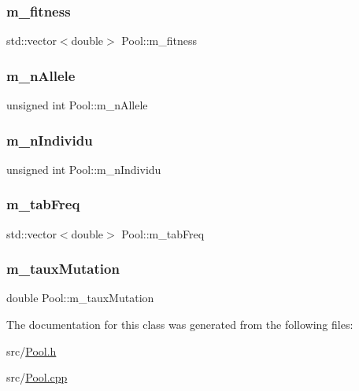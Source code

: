 \subsubsection{\texorpdfstring{m\+\_\+fitness}{m\_fitness}}
{\footnotesize\ttfamily std\+::vector$<$double$>$ Pool\+::m\+\_\+fitness\hspace{0.3cm}{\ttfamily [protected]}}

\hypertarget{class_pool_aa42040dcc5fc415227c86f684e40eb0c}{}\label{class_pool_aa42040dcc5fc415227c86f684e40eb0c} 
\subsubsection{\texorpdfstring{m\+\_\+n\+Allele}{m\_nAllele}}
{\footnotesize\ttfamily unsigned int Pool\+::m\+\_\+n\+Allele\hspace{0.3cm}{\ttfamily [protected]}}

\hypertarget{class_pool_ae07f1e012a30ee7bb47280d03b5ccfb6}{}\label{class_pool_ae07f1e012a30ee7bb47280d03b5ccfb6} 
\subsubsection{\texorpdfstring{m\+\_\+n\+Individu}{m\_nIndividu}}
{\footnotesize\ttfamily unsigned int Pool\+::m\+\_\+n\+Individu\hspace{0.3cm}{\ttfamily [protected]}}

\hypertarget{class_pool_ad3a94e7a298126eee82a7b4796a9970e}{}\label{class_pool_ad3a94e7a298126eee82a7b4796a9970e} 
\subsubsection{\texorpdfstring{m\+\_\+tab\+Freq}{m\_tabFreq}}
{\footnotesize\ttfamily std\+::vector$<$double$>$ Pool\+::m\+\_\+tab\+Freq\hspace{0.3cm}{\ttfamily [protected]}}

\hypertarget{class_pool_a2d1dff3e84b72f7048d33dc3d711e9e0}{}\label{class_pool_a2d1dff3e84b72f7048d33dc3d711e9e0} 
\subsubsection{\texorpdfstring{m\+\_\+taux\+Mutation}{m\_tauxMutation}}
{\footnotesize\ttfamily double Pool\+::m\+\_\+taux\+Mutation\hspace{0.3cm}{\ttfamily [protected]}}



The documentation for this class was generated from the following files\+:\begin{DoxyCompactItemize}
\item 
src/\hyperlink{_pool_8h}{Pool.\+h}\item 
src/\hyperlink{_pool_8cpp}{Pool.\+cpp}\end{DoxyCompactItemize}
